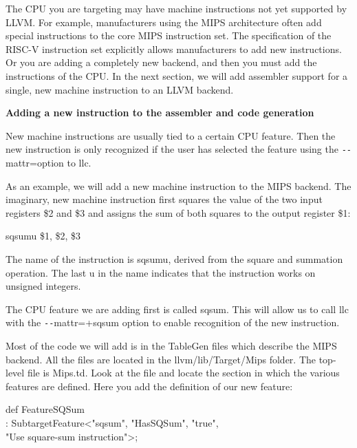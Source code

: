 The CPU you are targeting may have machine instructions not yet supported by LLVM. For example, manufacturers using the MIPS architecture often add special instructions to the core MIPS instruction set. The specification of the RISC-V instruction set explicitly allows manufacturers to add new instructions. Or you are adding a completely new backend, and then you must add the instructions of the CPU. In the next section, we will add assembler support for a single, new machine instruction to an LLVM backend.\par

\hspace*{\fill} \par %
\textbf{Adding a new instruction to the assembler and code generation}

New machine instructions are usually tied to a certain CPU feature. Then the new instruction is only recognized if the user has selected the feature using the \verb|--|mattr=option to llc.\par

As an example, we will add a new machine instruction to the MIPS backend. The imaginary, new machine instruction first squares the value of the two input registers \$2 and \$3 and assigns the sum of both squares to the output register \$1:\par

\begin{tcolorbox}[colback=white,colframe=black]
sqsumu \$1, \$2, \$3
\end{tcolorbox}

The name of the instruction is sqsumu, derived from the square and summation operation. The last u in the name indicates that the instruction works on unsigned integers.\par

The CPU feature we are adding first is called sqsum. This will allow us to call llc with the \verb|--|mattr=+sqsum option to enable recognition of the new instruction.\par

Most of the code we will add is in the TableGen files which describe the MIPS backend. All the files are located in the llvm/lib/Target/Mips folder. The top-level file is Mips.td. Look at the file and locate the section in which the various features are defined. Here you add the definition of our new feature:\par

\begin{tcolorbox}[colback=white,colframe=black]
def FeatureSQSum \\
\hspace*{1cm}: SubtargetFeature<"sqsum", "HasSQSum", "true", \\
\hspace*{6cm}"Use square-sum instruction">;
\end{tcolorbox}

